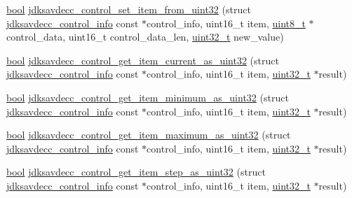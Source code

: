 \begin{DoxyCompactItemize}
\item 
\hyperlink{avb__gptp_8h_af6a258d8f3ee5206d682d799316314b1}{bool} \hyperlink{group__aem__control__value__helpers_ga509d05d942f87c970da733e1c38d8ce6}{jdksavdecc\+\_\+control\+\_\+set\+\_\+item\+\_\+from\+\_\+uint32} (struct \hyperlink{structjdksavdecc__control__info}{jdksavdecc\+\_\+control\+\_\+info} const $\ast$control\+\_\+info, uint16\+\_\+t item, \hyperlink{stdint_8h_aba7bc1797add20fe3efdf37ced1182c5}{uint8\+\_\+t} $\ast$control\+\_\+data, uint16\+\_\+t control\+\_\+data\+\_\+len, \hyperlink{parse_8c_a6eb1e68cc391dd753bc8ce896dbb8315}{uint32\+\_\+t} new\+\_\+value)
\item 
\hyperlink{avb__gptp_8h_af6a258d8f3ee5206d682d799316314b1}{bool} \hyperlink{group__aem__control__value__helpers_gaa25e4ed4fc7f0628546a8f02f690a5a4}{jdksavdecc\+\_\+control\+\_\+get\+\_\+item\+\_\+current\+\_\+as\+\_\+uint32} (struct \hyperlink{structjdksavdecc__control__info}{jdksavdecc\+\_\+control\+\_\+info} const $\ast$control\+\_\+info, uint16\+\_\+t item, \hyperlink{parse_8c_a6eb1e68cc391dd753bc8ce896dbb8315}{uint32\+\_\+t} $\ast$result)
\item 
\hyperlink{avb__gptp_8h_af6a258d8f3ee5206d682d799316314b1}{bool} \hyperlink{group__aem__control__value__helpers_gae6b2fbdc79594c4f44ddf8f4901bfe28}{jdksavdecc\+\_\+control\+\_\+get\+\_\+item\+\_\+minimum\+\_\+as\+\_\+uint32} (struct \hyperlink{structjdksavdecc__control__info}{jdksavdecc\+\_\+control\+\_\+info} const $\ast$control\+\_\+info, uint16\+\_\+t item, \hyperlink{parse_8c_a6eb1e68cc391dd753bc8ce896dbb8315}{uint32\+\_\+t} $\ast$result)
\item 
\hyperlink{avb__gptp_8h_af6a258d8f3ee5206d682d799316314b1}{bool} \hyperlink{group__aem__control__value__helpers_ga34201ea5ebbb9afaecfc6997eba7b11a}{jdksavdecc\+\_\+control\+\_\+get\+\_\+item\+\_\+maximum\+\_\+as\+\_\+uint32} (struct \hyperlink{structjdksavdecc__control__info}{jdksavdecc\+\_\+control\+\_\+info} const $\ast$control\+\_\+info, uint16\+\_\+t item, \hyperlink{parse_8c_a6eb1e68cc391dd753bc8ce896dbb8315}{uint32\+\_\+t} $\ast$result)
\item 
\hyperlink{avb__gptp_8h_af6a258d8f3ee5206d682d799316314b1}{bool} \hyperlink{group__aem__control__value__helpers_ga84f6e51f944dbbaa98afef992f25be49}{jdksavdecc\+\_\+control\+\_\+get\+\_\+item\+\_\+step\+\_\+as\+\_\+uint32} (struct \hyperlink{structjdksavdecc__control__info}{jdksavdecc\+\_\+control\+\_\+info} const $\ast$control\+\_\+info, uint16\+\_\+t item, \hyperlink{parse_8c_a6eb1e68cc391dd753bc8ce896dbb8315}{uint32\+\_\+t} $\ast$result)
\item 

\end{DoxyCompactItemize}
